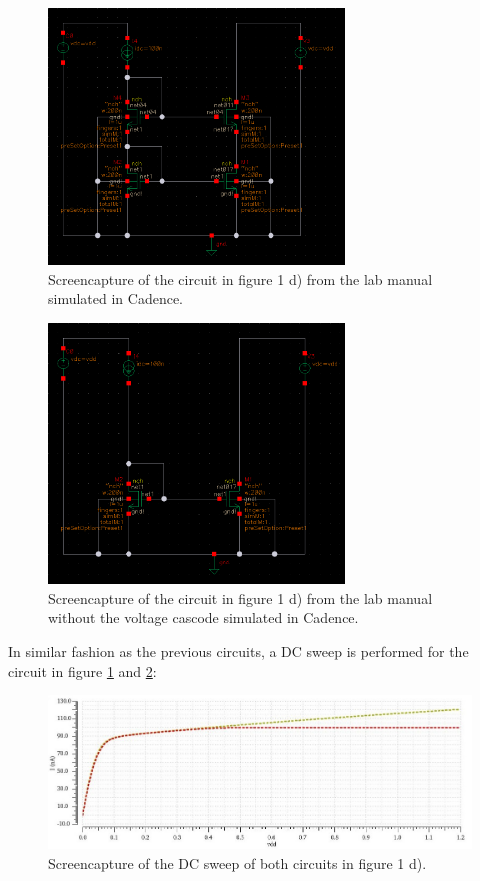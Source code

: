 \documentclass[onecolumn]{article}
\begin{document}
\begin{figure}[h!]
    \centering
    \includegraphics[width=0.7\textwidth]{circuit_d_cascode.png}
    \caption{Screencapture of the circuit in figure 1 d) from the lab manual simulated in Cadence.}
    \label{fig:circuitd}
\end{figure}

\begin{figure}[h!]
    \centering
    \includegraphics[width=0.7\textwidth]{circuit_d_simple.png}
    \caption{Screencapture of the circuit in figure 1 d) from the lab manual without the voltage cascode simulated in Cadence.}
    \label{fig:circuitdsimple}
\end{figure}

\clearpage

In similar fashion as the previous circuits, a DC sweep is performed for the circuit in figure \ref{fig:circuitd} and \ref{fig:circuitdsimple}:

\begin{figure}[h!]
    \centering
    \includegraphics[width=1\textwidth]{plot_circuit_d_dc_sweep_omskjert.jpg}
    \caption{Screencapture of the DC sweep of both circuits in figure 1 d).}
    \label{fig:plotd}
\end{figure}
\end{document}

